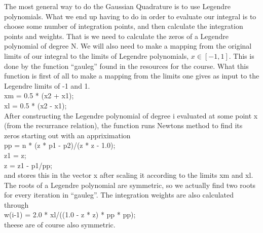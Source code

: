 \documentclass[a4paper,english, 10pt, twoside]{article}
\begin{document}
The most general way to do the Gaussian Quadrature is to use Legendre polynomials. What we end up having to do in order to 
evaluate our integral is to choose some number of integration points, and then calculate the integration points and weights. 
That is we need to calculate the zeros of a Legendre polynomial of degree N. We will also need to make a mapping from the 
original limits of our integral to the limits of Legendre polynomials, $x\in [-1,1]$. This is done by the function ``gauleg'' 
found in the resources for the course. What this function is first of all to make a mapping from the limits one gives as 
input to the Legendre limits of -1 and 1. \\
   xm = 0.5 * (x2 + x1);\\
   xl = 0.5 * (x2 - x1);\\
After constructing the Legendre polynomial of degree i evaluated at some point x (from the recurrance relation),
the function runs Newtons method to find its zeros starting out with an appriximation\\
  pp = n * (z * p1 - p2)/(z * z - 1.0);\\
  z1 = z;\\
  z  = z1 - p1/pp;\\
and stores this in the vector x after scaling it according to the limits xm and xl. The roots of a Legendre polynomial are 
symmetric, so we actually find two roots for every iteration in ``gauleg''. The integration weights are also calculated through\\
w(i-1) = 2.0 * xl/((1.0 - z * z) * pp * pp);\\
theese are of course also symmetric.\\
\end{document}
